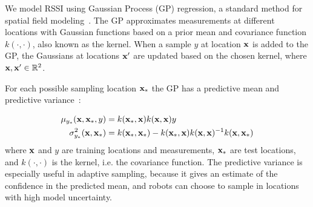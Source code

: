 We model RSSI using Gaussian Process (GP) regression, a standard method for spatial field modeling~\cite{Rasmussen2006}.
The GP approximates measurements at different locations with Gaussian functions based on a prior mean and covariance function $k(\cdot,\cdot)$, also known as the kernel.
When a sample $y$ at location ${\bf x}$ is added to the GP, the Gaussians at locations ${\bf x}'$ are updated based on the chosen kernel, where ${\bf x,x}' \in \mathbb{R}^2$.

For each possible sampling location ${\bf x}_*$ the GP has a predictive mean and predictive variance~\cite{Rasmussen2006}:

\begin{align}
 \mu_{y_*}({\bf x}, {\bf x}_*, y) &=  k({\bf x}_*,{\bf x}) k({\bf x},{\bf x}) y\\
 \sigma^2_{y_*}({\bf x}, {\bf x}_*) &= k({\bf x}_*,{\bf x}_*) - k({\bf x}_*,{\bf x}) k({\bf x},{\bf x})^{-1} k({\bf x},{\bf x}_*)
\end{align}
% 
where ${\bf x}$ and $y$ are training locations and measurements, ${\bf x_*}$ are test locations,
and $k(\cdot,\cdot)$ is the kernel, i.e. the covariance function. The predictive variance is especially useful in adaptive sampling, because it gives an estimate of the confidence in the predicted mean, and robots can choose to sample in locations with high model uncertainty.

